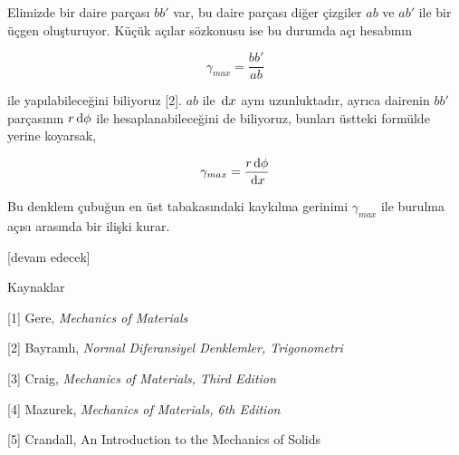 \documentclass[12pt,fleqn]{article}\usepackage{../../common}
\begin{document}
Elimizde bir daire parçası $bb'$ var, bu daire parçası diğer çizgiler $ab$
ve $ab'$ ile bir üçgen oluşturuyor. Küçük açılar sözkonusu ise bu durumda
açı hesabının

$$
\gamma_{max} = \frac{bb'}{ab}
$$

ile yapılabileceğini biliyoruz [2]. $ab$ ile $\,\mathrm{d} x$ aynı uzunluktadır,
ayrıca dairenin $bb'$ parçasının $r \,\mathrm{d} \phi$ ile hesaplanabileceğini de
biliyoruz, bunları üstteki formülde yerine koyarsak,

$$
\gamma_{max} = \frac{r \,\mathrm{d} \phi}{\,\mathrm{d} x}
$$

Bu denklem çubuğun en üst tabakasındaki kaykılma gerinimi $\gamma_{max}$
ile burulma açısı arasında bir ilişki kurar.


[devam edecek]

Kaynaklar

[1] Gere, {\em Mechanics of Materials}

[2] Bayramlı, {\em Normal Diferansiyel Denklemler, Trigonometri}

[3] Craig, {\em Mechanics of Materials, Third Edition}

[4] Mazurek, {\em Mechanics of Materials, 6th Edition}

[5] Crandall, An Introduction to the Mechanics of Solids
\end{document}
